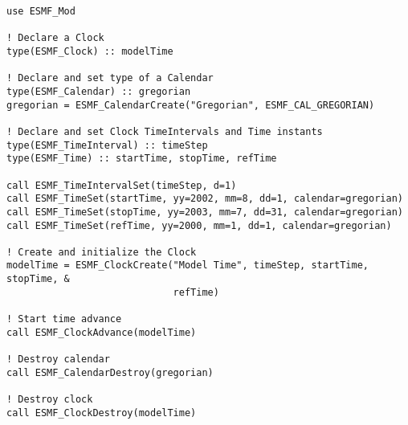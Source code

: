
\begin{verbatim}
use ESMF_Mod

! Declare a Clock
type(ESMF_Clock) :: modelTime

! Declare and set type of a Calendar
type(ESMF_Calendar) :: gregorian
gregorian = ESMF_CalendarCreate("Gregorian", ESMF_CAL_GREGORIAN)

! Declare and set Clock TimeIntervals and Time instants
type(ESMF_TimeInterval) :: timeStep
type(ESMF_Time) :: startTime, stopTime, refTime

call ESMF_TimeIntervalSet(timeStep, d=1)
call ESMF_TimeSet(startTime, yy=2002, mm=8, dd=1, calendar=gregorian)
call ESMF_TimeSet(stopTime, yy=2003, mm=7, dd=31, calendar=gregorian)
call ESMF_TimeSet(refTime, yy=2000, mm=1, dd=1, calendar=gregorian)

! Create and initialize the Clock
modelTime = ESMF_ClockCreate("Model Time", timeStep, startTime, stopTime, &
                             refTime)

! Start time advance
call ESMF_ClockAdvance(modelTime)

! Destroy calendar
call ESMF_CalendarDestroy(gregorian)

! Destroy clock
call ESMF_ClockDestroy(modelTime)
\end{verbatim}
